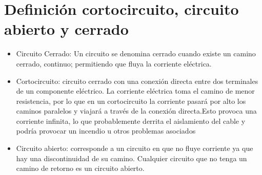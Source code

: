 \section{Definición cortocircuito, circuito abierto y cerrado}
\begin{itemize}
    \item Circuito Cerrado: Un circuito se denomina cerrado cuando existe un camino cerrado, continuo; permitiendo que fluya la corriente eléctrica.
    \newline
    \item Cortocircuito:  circuito cerrado con una conexión directa entre dos terminales de un componente eléctrico. La corriente eléctrica toma el camino de menor resistencia, por lo que en un cortocircuito la corriente pasará por alto los caminos paralelos y viajará a través de la conexión directa.Esto provoca una corriente infinita, lo que probablemente derrita el aislamiento del cable y podría provocar un incendio u otros problemas asociados
    \newline
    \item Circuito abierto: corresponde a un circuito en que no fluye corriente ya que hay una discontinuidad de su camino. Cualquier circuito que no tenga un camino de retorno es un circuito abierto.
\end{itemize}


